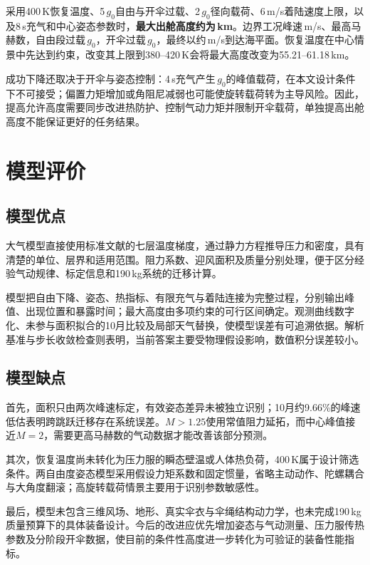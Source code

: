 \documentclass[11pt,a4paper]{article}
\begin{document}
采用400\,K恢复温度、5\,$g_0$自由与开伞过载、2\,$g_0$径向载荷、6\,m/s着陆速度上限，以及8\,s充气和中心姿态参数时，\textbf{最大出舱高度约为\MaxHeight\,km}。边界工况峰速\PeakV\,m/s、最高马赫数\PeakMach，自由段过载\FreeG\,$g_0$，开伞过载\OpenG\,$g_0$，最终以约\LandingV\,m/s到达海平面。恢复温度在中心情景中先达到约束，改变其上限到380--420\,K会将最大高度改变为55.21--61.18\,km。

成功下降还取决于开伞与姿态控制：4\,s充气产生\FastOpenG\,$g_0$的峰值载荷，在本文设计条件下不可接受；偏置力矩增加或角阻尼减弱也可能使旋转载荷转为主导风险。因此，提高允许高度需要同步改进热防护、控制气动力矩并限制开伞载荷，单独提高出舱高度不能保证更好的任务结果。

\section{模型评价}
\subsection{模型优点}
大气模型直接使用标准文献的七层温度梯度，通过静力方程推导压力和密度，具有清楚的单位、层界和适用范围。阻力系数、迎风面积及质量分别处理，便于区分经验气动规律、标定信息和190\,kg系统的迁移计算。

模型把自由下降、姿态、热指标、有限充气与着陆连接为完整过程，分别输出峰值、出现位置和暴露时间；最大高度由多项约束的可行区间确定。观测曲线数字化、未参与面积拟合的10月比较及局部天气替换，使模型误差有可追溯依据。解析基准与步长收敛检查则表明，当前答案主要受物理假设影响，数值积分误差较小。

\subsection{模型缺点}
首先，面积只由两次峰速标定，有效姿态差异未被独立识别；10月约9.66\%的峰速低估表明跨跳跃迁移存在系统误差。$M>1.25$使用常值阻力延拓，而中心峰值接近$M=2$，需要更高马赫数的气动数据才能改善该部分预测。

其次，恢复温度尚未转化为压力服的瞬态壁温或人体热负荷，400\,K属于设计筛选条件。两自由度姿态模型采用假设力矩系数和固定惯量，省略主动动作、陀螺耦合与大角度翻滚；高旋转载荷情景主要用于识别参数敏感性。

最后，模型未包含三维风场、地形、真实伞衣与伞绳结构动力学，也未完成190\,kg质量预算下的具体装备设计。今后的改进应优先增加姿态与气动测量、压力服传热参数及分阶段开伞数据，使目前的条件性高度进一步转化为可验证的装备性能指标。
\end{document}
